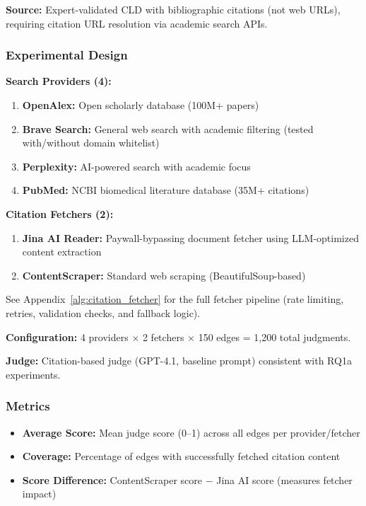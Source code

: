 \textbf{Source:} Expert-validated CLD with bibliographic citations (not web URLs), requiring citation URL resolution via academic search APIs.

\subsubsection{Experimental Design}

\textbf{Search Providers (4):}
\begin{enumerate}[noitemsep]
    \item \textbf{OpenAlex:} Open scholarly database (100M+ papers)
    \item \textbf{Brave Search:} General web search with academic filtering (tested with/without domain whitelist)
    \item \textbf{Perplexity:} AI-powered search with academic focus
    \item \textbf{PubMed:} NCBI biomedical literature database (35M+ citations)
\end{enumerate}

\textbf{Citation Fetchers (2):}
\begin{enumerate}[noitemsep]
    \item \textbf{Jina AI Reader:} Paywall-bypassing document fetcher using LLM-optimized content extraction
    \item \textbf{ContentScraper:} Standard web scraping (BeautifulSoup-based)
\end{enumerate}
See Appendix~\ref{alg:citation_fetcher} for the full fetcher pipeline (rate limiting, retries, validation checks, and fallback logic).

\textbf{Configuration:} 4 providers $\times$ 2 fetchers $\times$ 150 edges = 1,200 total judgments.

\textbf{Judge:} Citation-based judge (GPT-4.1, baseline prompt) consistent with RQ1a experiments.

\subsubsection{Metrics}

\begin{itemize}[noitemsep]
    \item \textbf{Average Score:} Mean judge score (0--1) across all edges per provider/fetcher
    \item \textbf{Coverage:} Percentage of edges with successfully fetched citation content
    \item \textbf{Score Difference:} ContentScraper score $-$ Jina AI score (measures fetcher impact)
\end{itemize}

